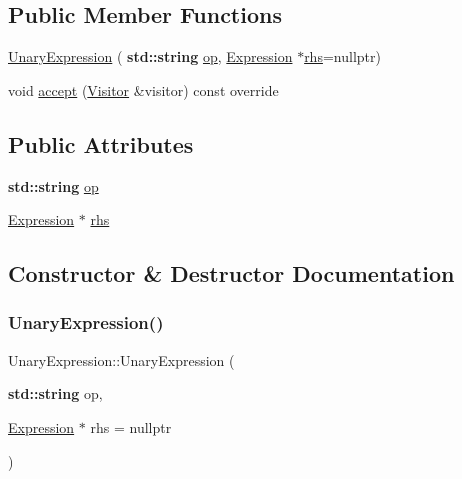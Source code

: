 \subsection*{Public Member Functions}
\begin{DoxyCompactItemize}
\item 
\hyperlink{struct_unary_expression_a0a2158571198f271b43612707666e8fa}{Unary\+Expression} (\textbf{ std\+::string} \hyperlink{struct_unary_expression_a057cfd54844d5b36e15f16ee5272b071}{op}, \hyperlink{struct_expression}{Expression} $\ast$\hyperlink{struct_unary_expression_a53e53c6c0a0b76c46cb49a1fa48be5a5}{rhs}=nullptr)
\item 
void \hyperlink{struct_unary_expression_a88c89a0268ecfa5008b5afe7bc47913a}{accept} (\hyperlink{struct_visitor}{Visitor} \&visitor) const override
\end{DoxyCompactItemize}
\subsection*{Public Attributes}
\begin{DoxyCompactItemize}
\item 
\textbf{ std\+::string} \hyperlink{struct_unary_expression_a057cfd54844d5b36e15f16ee5272b071}{op}
\item 
\hyperlink{struct_expression}{Expression} $\ast$ \hyperlink{struct_unary_expression_a53e53c6c0a0b76c46cb49a1fa48be5a5}{rhs}
\end{DoxyCompactItemize}


\subsection{Constructor \& Destructor Documentation}
\mbox{\label{struct_unary_expression_a0a2158571198f271b43612707666e8fa}} 
\subsubsection{\texorpdfstring{Unary\+Expression()}{UnaryExpression()}}
{\footnotesize\ttfamily Unary\+Expression\+::\+Unary\+Expression (\begin{DoxyParamCaption}\item[{\textbf{ std\+::string}}]{op,  }\item[{\hyperlink{struct_expression}{Expression} $\ast$}]{rhs = {\ttfamily nullptr} }\end{DoxyParamCaption})\hspace{0.3cm}{\ttfamily [inline]}}



